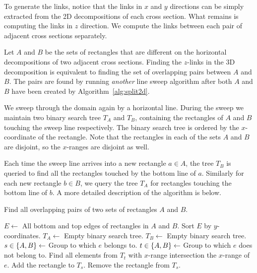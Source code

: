\documentclass[english,gradu]{tktltiki2018}
\begin{document}
To generate the links, notice that the links in $x$ and $y$ directions can be simply extracted from the 2D decompositions of each cross section.
What remains is computing the links in $z$ direction.
We compute the links between each pair of adjacent cross sections separately.

Let $A$ and $B$ be the sets of rectangles that are different on the horizontal decompositions of two adjacent cross sections.
Finding the $z$-links in the 3D decomposition is equivalent to finding the set of overlapping pairs between $A$ and $B$.
The pairs are found by running \emph{another} line sweep algorithm after both $A$ and $B$ have been created by Algorithm~\ref{alg:split2d}.

We sweep through the domain again by a horizontal line.
During the sweep we maintain two binary search tree $T_A$ and $T_B$, containing the rectangles of $A$ and $B$ touching the sweep line respectively.
The binary search tree is ordered by the $x$-coordinate of the rectangle.
Note that the rectangles in each of the sets $A$ and $B$ are disjoint, so the $x$-ranges are disjoint as well.

Each time the sweep line arrives into a new rectangle $a\in A$, the tree $T_B$ is queried to find all the rectangles touched by the bottom line of $a$.
Similarly for each new rectangle $b\in B$, we query the tree $T_A$ for rectangles touching the bottom line of $b$.
A more detailed description of the algorithm is below.

\begin{alg}\label{alg:overlap2d}
Find all overlapping pairs of two sets of rectangles $A$ and $B$.
\begin{algorithmic}
\State $E\gets$ All bottom and top edges of rectangles in $A$ and $B$.
\State Sort $E$ by $y$-coordinates.
\State $T_A\gets$ Empty binary search tree.
\State $T_B\gets$ Empty binary search tree.
	\State $s\in\left\{A,B\right\}\gets$ Group to which $e$ belongs to.
	\State $t\in\left\{A,B\right\}\gets$ Group to which $e$ does not belong to.
		\State Find all elements from $T_t$ with $x$-range intersection the $x$-range of $e$.
		\State Add the rectangle to $T_s$.
	\Else
		\State Remove the rectangle from $T_s$.
	\EndIf
\EndFor
\end{algorithmic}
\end{alg}
\end{document}
